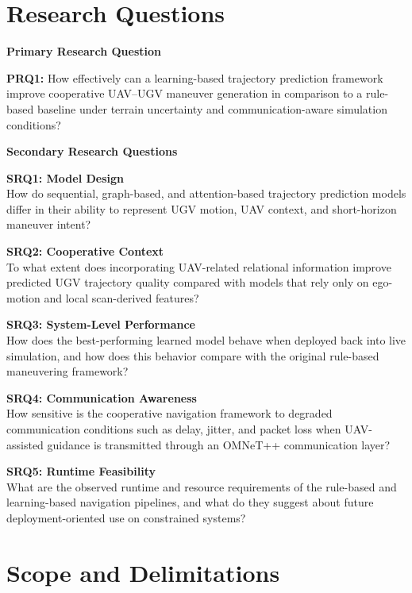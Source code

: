 \section{Research Questions}

\textbf{Primary Research Question}

\textbf{PRQ1:}
How effectively can a learning-based trajectory prediction framework improve cooperative UAV--UGV maneuver generation in comparison to a rule-based baseline under terrain uncertainty and communication-aware simulation conditions?

\bigskip

\textbf{Secondary Research Questions}

\textbf{SRQ1: Model Design} \\
How do sequential, graph-based, and attention-based trajectory prediction models differ in their ability to represent UGV motion, UAV context, and short-horizon maneuver intent?

\medskip

\textbf{SRQ2: Cooperative Context} \\
To what extent does incorporating UAV-related relational information improve predicted UGV trajectory quality compared with models that rely only on ego-motion and local scan-derived features?

\medskip

\textbf{SRQ3: System-Level Performance} \\
How does the best-performing learned model behave when deployed back into live simulation, and how does this behavior compare with the original rule-based maneuvering framework?

\medskip

\textbf{SRQ4: Communication Awareness} \\
How sensitive is the cooperative navigation framework to degraded communication conditions such as delay, jitter, and packet loss when UAV-assisted guidance is transmitted through an OMNeT++ communication layer?

\medskip

\textbf{SRQ5: Runtime Feasibility} \\
What are the observed runtime and resource requirements of the rule-based and learning-based navigation pipelines, and what do they suggest about future deployment-oriented use on constrained systems?

\section{Scope and Delimitations}

